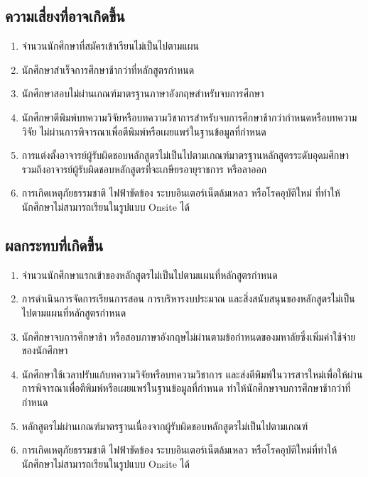 \subsection{ความเสี่ยงที่อาจเกิดขึ้น}
 \begin{enumerate}  	
   	\item จำนวนนักศึกษาที่สมัครเข้าเรียนไม่เป็นไปตามแผน
   	\item นักศึกษาสำเร็จการศึกษาช้ากว่าที่หลักสูตรกำหนด
   	\item นักศึกษาสอบไม่ผ่านเกณฑ์มาตรฐานภาษาอังกฤษสำหรับจบการศึกษา
   	\item นักศึกษาตีพิมพ์บทความวิจัยหรือบทความวิชาการสำหรับจบการศึกษาช้ากว่ากำหนดหรือบทความวิจัย	ไม่ผ่านการพิจารณาเพื่อตีพิมพ์หรือเผยแพร่ในฐานข้อมูลที่กำหนด
   	\item การแต่งตั้งอาจารย์ผู้รับผิดชอบหลักสูตรไม่เป็นไปตามเกณฑ์มาตรฐานหลักสูตรระดับอุดมศึกษารวมถึงอาจารย์ผู้รับผิดชอบหลักสูตรที่จะเกษียรอายุราชการ หรือลาออก
   	\item การเกิดเหตุภัยธรรมชาติ ไฟฟ้าขัดข้อง ระบบอินเตอร์เน็ตล้มเหลว หรือโรคอุบัติใหม่ ที่ทำให้นักศึกษาไม่สามารถเรียนในรูปแบบ Onsite ได้   	
   	   	\end{enumerate}  

\subsection{ผลกระทบที่เกิดขึ้น}
 \begin{enumerate}  	
   	\item จำนวนนักศึกษาแรกเข้าของหลักสูตรไม่เป็นไปตามแผนที่หลักสูตรกำหนด
   	\item การดำเนินการจัดการเรียนการสอน การบริหารงบประมาณ และสิ่งสนับสนุนของหลักสูตรไม่เป็นไปตามแผนที่หลักสูตรกำหนด
   	\item นักศึกษาจบการศึกษาช้า หรือสอบภาษาอังกฤษไม่ผ่านตามข้อกำหนดของมหาลัยซึ่งเพิ่มค่าใช้จ่ายของนักศึกษา   
   	\item นักศึกษาใช้เวลาปรับแก้บทความวิจัยหรือบทความวิชาการ และส่งตีพิมพ์ในวารสารใหม่เพื่อให้ผ่านการพิจารณาเพื่อตีพิมพ์หรือเผยแพร่ในฐานข้อมูลที่กำหนด ทำให้นักศึกษาจบการศึกษาช้ากว่าที่กำหนด
   	\item หลักสูตรไม่ผ่านเกณฑ์มาตรฐานเนื่องจากผู้รับผิดชอบหลักสูตรไม่เป็นไปตามเกณฑ์
   	\item การเกิดเหตุภัยธรรมชาติ ไฟฟ้าขัดข้อง ระบบอินเตอร์เน็ตล้มเหลว หรือโรคอุบัติใหม่ที่ทำให้นักศึกษาไม่สามารถเรียนในรูปแบบ Onsite ได้   	
   	   	\end{enumerate} 

